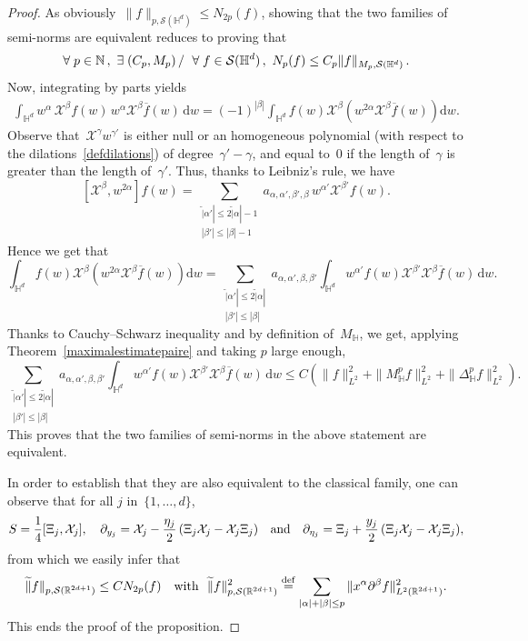 \documentclass[AHL,Unicode,longabstracts]{cedram}
\newcommand*\sumetage[2]{\sum_{\substack{{#1}\\{#2}}}}
\let\wt=\widetilde
\def\N{\mathop{\mathbb N\kern 0pt}\nolimits}
\def\R{{\mathop{\mathbb R\kern 0pt}\nolimits}}
\newcommand*\bbH{\mathbb{H}}
\newcommand{\D}{\Delta}
\newcommand{\wt}{\widetilde}
\newcommand*\cS{\mathcal{S}}
\newcommand*\cX{\mathcal{X}}
\newcommand*\N{\mathbb{N}}
\newcommand*\R{\mathbb{R}}
\newcommand*\bbH{\mathbb{H}}
\newcommand{\andf}{\quad\hbox{and}\quad}
\newcommand*\eqdefa{\overset{\mathrm{def}}{=}}
\newcommand*{\dd}{\mathrm{d}}
\newcommand{\dw}{\dd w}
\renewcommand*{\cdotp}{.}
\let\oldexists\exists
\renewcommand*{\exists}{\mathrel{\oldexists}}
\let\oldforall\forall
\renewcommand*{\forall}{\mathrel{\oldforall}}
\begin{document}
\begin{proof}
As obviously~$\|f\|_{p,\cS(\bbH^d)}\leq N_{2p} (f)$, showing that the two families of semi-norms are equivalent reduces to proving that
\begin{equation}\label{c:schwartzdemooeq3}
\forall p\in \N\,,\ \exists (C_p,M_p)\,/\ \forall f\in \cS(\bbH^d)\,,\ N_p(f)\leq C_p\|f\|_{M_p,\cS(\bbH^d)} \,.
\end{equation}
Now, integrating by parts yields
\begin{align*}
\int_{\bbH^d} w^\alpha \,\cX^\beta f(w) \,w^\alpha \cX^\beta\overline f(w)\,\dw = (-1)^{|\beta|} \int_{\bbH^d} f(w) \cX^\beta\left(w^{2\alpha} \cX^\beta \overline f(w)\right)\dw.
\end{align*}
Observe that~$\cX^\gamma w^{\gamma'}$ is either null or an homogeneous polynomial (with respect to the dilations~\eqref{defdilations}) of degree~$\gamma'-\gamma$, and equal to~$0$ if the length of~$\gamma$ is greater than the length of~$\gamma'$. Thus, thanks to Leibniz's rule, we have
\begin{equation}\label{c:schwartzdemooeq0}
[\cX^\beta,w^{2\alpha}] f(w) = \sumetage { \wt |\alpha'|\leq 2\wt |\alpha|-1} {|\beta'|\leq|\beta|-1} a_{\alpha,\alpha',\beta',\beta} \,w^{\alpha'} \cX^{\beta'}f(w).
\end{equation}
Hence we get that
\[
\int_{\bbH^d} f(w) \cX^\beta\left(w^{2\alpha} \cX^\beta \overline f(w)\right)\dw =
\sumetage {\wt|\alpha'|\leq 2 \wt |\alpha|} {|\beta'|\leq |\beta|} a_{\alpha,\alpha',\beta,\beta'} \int_{\bbH^d} w^{\alpha'} f(w) \cX^{\beta'} \cX^\beta\overline f(w) \,\dw.
\]
Thanks to Cauchy--Schwarz inequality and by definition of~$M_\bbH$, we get, applying Theorem~\ref{maximalestimatepaire} and taking $p$ large enough,
\[
\sumetage {\wt|\alpha'|\leq 2 \wt |\alpha|} {|\beta'|\leq |\beta|} a_{\alpha,\alpha',\beta,\beta'} \int_{\bbH^d} w^{\alpha'} f(w) \cX^{\beta'} \cX^\beta\overline f(w)\, \dw
\leq C\left(\|f\|_{L^2}^2 + \|M_\bbH^{p} f\|_{L^2} ^2+ \|\D_\bbH^{p} f\|_{L^2}^2\right)\cdotp
\]
This proves that the two families of semi-norms in the above statement are equivalent.

In order to establish that they are also equivalent to the classical family, one can observe that for all $j$ in~$ \{1, \dots,d \}$,
\[
S = \frac 1 4 [\Xi_j,\cX_j],\quad \partial_{y_j}= \cX_j - \frac {\eta_j} 2 \,(\Xi_j\cX_j- \cX_j \Xi_j) \andf \partial_{\eta_j}= \Xi_j+ \frac {y_j} 2 \,(\Xi_j\cX_j- \cX_j \Xi_j),
\]
from which we easily infer that
\[
\wt \|f\|_{p,\cS(\R^{2d+1})}
\leq C N_{2p}(f)
\quad\hbox{with }\ \wt \|f\|_{p,\cS(\R^{2d+1})}^2 \eqdefa \sum_{|\alpha|+|\beta|\leq p} \|x^\alpha \partial^\beta f \|_{L^2(\R^{2d+1})}^2.
\]
This ends the proof of the proposition.
\end{proof}
\end{document}
